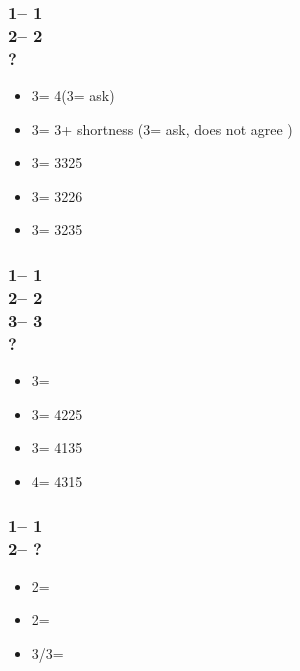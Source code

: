 \documentclass[12pt, a4paper]{report}
\begin{document}
{{        \subsubsection*{1\clubs -- 1\spades\\
                        2\spades -- 2\nt\\
                        ?}
        \begin{itemize}
            \item 3\clubs = 4\spades (3\diams = ask)
            \item 3\diams = 3\spades + shortness (3\hearts = ask, does not agree \spades)
            \item 3\hearts = 3325
            \item 3\spades = 3226
            \item 3\nt = 3235
        \end{itemize}

        \subsubsection*{1\clubs -- 1\spades\\
                        2\spades -- 2\nt\\
                        3\clubs -- 3\diams\\
                        ?}
        \begin{itemize}
            \item 3\hearts = \bal
            \item 3\spades = 4225
            \item 3\nt = 4135
            \item 4\clubs = 4315
        \end{itemize}

        \subsubsection*{1\diams -- 1\hearts\\
                        2\hearts -- ?}
        \begin{itemize}
            \item 2\spades = \gf
            \item 2\nt = \inv\ \spades
            \item 3\minor/3\hearts = \inv
        \end{itemize}

}}
\end{document}
